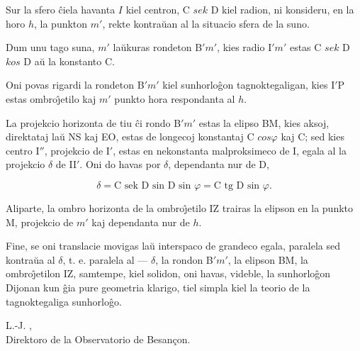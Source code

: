    Sur la sfero \^ciela havanta $I$ kiel centron, C $sek$ D kiel radion, ni
konsideru, en la horo $h$, la punkton $m'$, rekte kontra\u uan al la
situacio sfera de la suno.

   Dum unu tago suna, $m'$ la\u ukuras rondeton B$' m'$, kies radio I$' m'$
estas C $sek$ D $kos$ D a\u u la konstanto C.

   Oni povas rigardi la rondeton B$' m'$ kiel sunhorlo\^gon
tagnoktegaligan, kies I$'$P estas ombro\^{\j}etilo kaj $m'$ punkto
hora respondanta al $h$.

   La projekcio horizonta de tiu \^ci rondo B$' m'$ estas la elipso BM,
kies aksoj, direktataj la\u u NS kaj EO, estas de longecoj
konstantaj C $cos \varphi$ kaj C; sed kies centro I$''$,
projekcio de I$'$, estas en nekonstanta malproksimeco de I, egala
al la projekcio $\delta$ de II$'$. Oni do havas por $\delta$,
dependanta nur de D,

\[
\delta = \text{C sek D sin D sin }\varphi = \text{C tg D sin }\varphi.
\]

   Aliparte, la ombro horizonta de la ombro\^{\j}etilo IZ trairas la elipson
en la punkto M, projekcio de $m'$ kaj dependanta nur de $h$.

   Fine, se oni translacie movigas la\u u interspaco de grandeco egala,
paralela sed kontra\u ua al $\delta$, t. e. paralela al ---
$\delta$, la rondon B$' m'$, la elipson BM, la ombro\^{\j}etilon
IZ, samtempe, kiel solidon, oni havas, videble, la sunhorlo\^gon
Dijonan kun \^gia pure geometria klarigo, tiel simpla kiel la teorio
de la tagnoktegaliga sunhorlo\^go.

\begin{flushright}
\begin{minipage}{6cm}
\begin{center}
L.-J. ,\\
\footnotesize Direktoro de la Observatorio de Besan\c{c}on.
\end{center}
\end{minipage}
\end{flushright}

\smallrule{}

